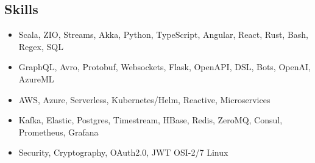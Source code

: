 \subsection*{Skills}

\begin{itemize}[noitemsep, nosep]
  \item Scala, ZIO, Streams, Akka, Python, TypeScript, Angular, React, Rust, Bash, Regex, SQL
  \item GraphQL, Avro, Protobuf, Websockets, Flask, OpenAPI, DSL, Bots, OpenAI, AzureML
  \item AWS, Azure, Serverless, Kubernetes/Helm, Reactive, Microservices
  \item Kafka, Elastic, Postgres, Timestream, HBase, Redis, ZeroMQ, Consul, Prometheus, Grafana
  \item Security, Cryptography, OAuth2.0, JWT \textbar{} OSI-2/7 \textbar{} Linux
\end{itemize}